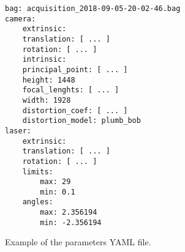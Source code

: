 \begin{figure}

    \begin{Verbatim}[frame=single, fontsize=\small]
bag: acquisition_2018-09-05-20-02-46.bag
camera:
    extrinsic:
    translation: [ ... ]
    rotation: [ ... ]
    intrinsic:
    principal_point: [ ... ]
    height: 1448
    focal_lenghts: [ ... ]
    width: 1928
    distortion_coef: [ ... ]
    distortion_model: plumb_bob
laser:
    extrinsic:
    translation: [ ... ]
    rotation: [ ... ]
    limits:
        max: 29
        min: 0.1
    angles:
        max: 2.356194
        min: -2.356194
    \end{Verbatim}

    \caption{Example of the parameters YAML file.}
    \label{figure:parameters-yaml}

\end{figure}

